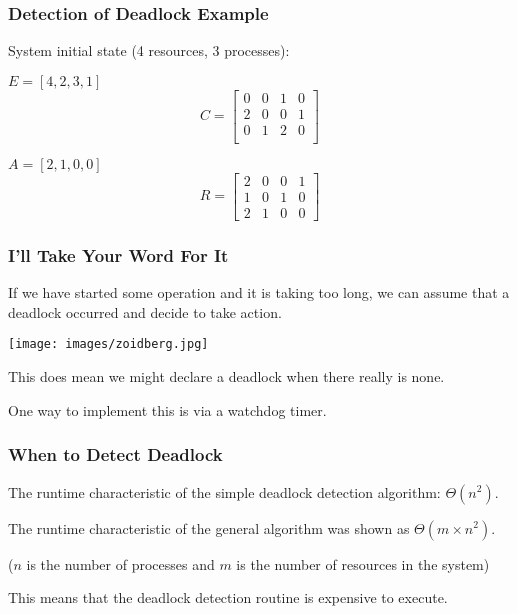\begin{frame}
	\frametitle{Detection of Deadlock Example}
	System initial state (4 resources, 3 processes):

	\begin{multicols}{2}
		\begin{center}
			$E = [4, 2, 3, 1]$
			\[ C =
				\left[ {\begin{array}{cccc}
								0 & 0 & 1 & 0 \\
								2 & 0 & 0 & 1 \\
								0 & 1 & 2 & 0 \\
							\end{array} } \right]
			\]
		\end{center}
		\columnbreak

		\begin{center}
			$A = [2, 1, 0, 0]$
			\[ R =
				\left[ {\begin{array}{cccc}
								2 & 0 & 0 & 1 \\
								1 & 0 & 1 & 0 \\
								2 & 1 & 0 & 0
							\end{array} } \right]
			\]
		\end{center}

	\end{multicols}


\end{frame}


\begin{frame}
\frametitle{I'll Take Your Word For It}

If we have started some operation and it is taking too long, we can assume that a deadlock occurred and decide to take action.

\begin{center}
	\texttt{[image: images/zoidberg.jpg]}
\end{center}

This does mean we might declare a deadlock when there really is none.

One way to implement this is via a watchdog timer.

\end{frame}


\begin{frame}
	\frametitle{When to Detect Deadlock}

	The runtime characteristic of the simple deadlock detection algorithm: $\Theta(n^{2})$.

	The runtime characteristic of the general algorithm was shown as $\Theta(m \times n^{2})$.

	($n$ is the number of processes and $m$ is the number of resources in the system)

	This means that the deadlock detection routine is expensive to execute.


\end{frame}

